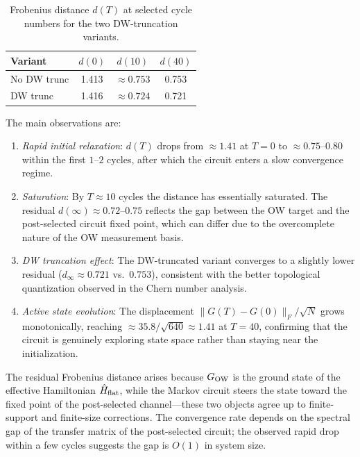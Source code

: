 \documentclass[aps,prb,twocolumn,showpacs,floatfix]{revtex4-2}
\newcommand{\Hflat}{\hat{H}_{\rm flat}}
\newcommand{\GO}{G_{\rm OW}}
\begin{document}
\begin{table}[h]
\caption{Frobenius distance $d(T)$ at selected cycle numbers for the two DW-truncation variants.}
\label{tab:frobenius}
\begin{ruledtabular}
\begin{tabular}{lccc}
Variant & $d(0)$ & $d(10)$ & $d(40)$ \\
\hline
No DW trunc & 1.413 & $\approx 0.753$ & 0.753 \\
DW trunc    & 1.416 & $\approx 0.724$ & 0.721 \\
\end{tabular}
\end{ruledtabular}
\end{table}

The main observations are:
\begin{enumerate}
  \item \emph{Rapid initial relaxation}: $d(T)$ drops from $\approx 1.41$ at $T=0$ to
    $\approx 0.75$--$0.80$ within the first $1$--$2$ cycles, after which the
    circuit enters a slow convergence regime.
  \item \emph{Saturation}: By $T \approx 10$ cycles the distance has essentially
    saturated.  The residual $d(\infty) \approx 0.72$--$0.75$ reflects the gap
    between the OW target and the post-selected circuit fixed point,
    which can differ due to the overcomplete nature of the OW measurement basis.
  \item \emph{DW truncation effect}: The DW-truncated variant converges to a slightly
    lower residual ($d_\infty \approx 0.721$ vs.\ $0.753$), consistent with the
    better topological quantization observed in the Chern number analysis.
  \item \emph{Active state evolution}: The displacement $\|G(T)-G(0)\|_F / \sqrt{N}$
    grows monotonically, reaching $\approx 35.8 / \sqrt{640} \approx 1.41$ at $T=40$,
    confirming that the circuit is genuinely exploring state space rather than
    staying near the initialization.
\end{enumerate}

The residual Frobenius distance arises because $\GO$ is the ground state of the
effective Hamiltonian $\Hflat$, while the Markov circuit steers the state toward
the fixed point of the post-selected channel—these two objects agree up to
finite-support and finite-size corrections.
The convergence rate depends on the spectral gap of the transfer matrix of the
post-selected circuit; the observed rapid drop within a few cycles suggests
the gap is $O(1)$ in system size.
\end{document}
